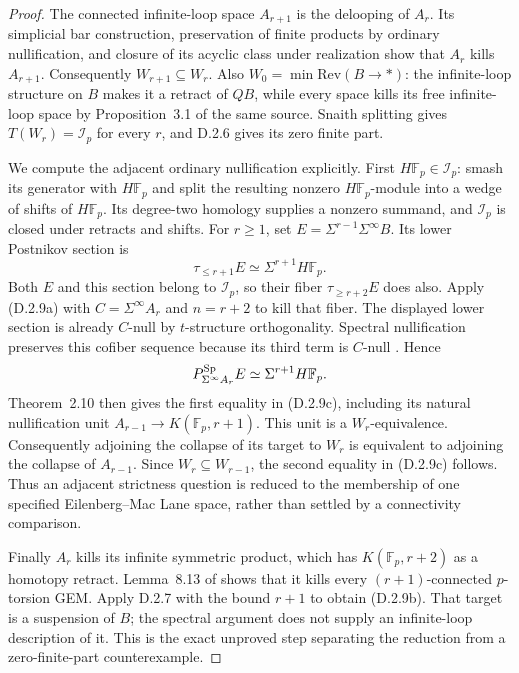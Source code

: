 \begin{proof}
The connected infinite-loop space $A_{r+1}$ is the delooping of
$A_r$. Its simplicial bar construction, preservation of finite
products by ordinary nullification, and closure of its acyclic
class under realization show that $A_r$ kills $A_{r+1}$.
Consequently $W_{r+1}\subseteq W_r$. Also
$W_0=\min\mathrm{Rev}(B\to *)$: the infinite-loop structure
on $B$ makes it a retract of $QB$, while every space kills its
free infinite-loop space by Proposition~3.1 of the same source.
Snaith splitting gives $T(W_r)=\mathcal I_p$ for every $r$,
and D.2.6 gives its zero finite part.

We compute the adjacent ordinary nullification explicitly. First
$H\mathbb F_p\in\mathcal I_p$: smash its generator with
$H\mathbb F_p$ and split the resulting nonzero
$H\mathbb F_p$-module into a wedge of shifts of
$H\mathbb F_p$. Its degree-two homology supplies a nonzero
summand, and $\mathcal I_p$ is closed under retracts and shifts.
For $r\geq1$, set $E=\Sigma^{r-1}\Sigma^\infty B$. Its lower
Postnikov section is
\[
 \tau_{\leq r+1}E\simeq\Sigma^{r+1}H\mathbb F_p.
\]
Both $E$ and this section belong to $\mathcal I_p$, so their
fiber $\tau_{\geq r+2}E$ does also. Apply
\textup{(D.2.9a)} with $C=\Sigma^\infty A_r$ and $n=r+2$ to
kill that fiber. The displayed lower section is already
$C$-null by $t$-structure orthogonality. Spectral nullification
preserves this cofiber sequence because its third term is
$C$-null \citep[Corollary~2.3]{Bousfield1996ULP}. Hence
\[
 P_{\Sigma^\infty A_r}^{\mathrm{Sp}}E
   \simeq\Sigma^{r+1}H\mathbb F_p.
\]
Theorem~2.10 then gives the first equality in
\textup{(D.2.9c)}, including its natural nullification unit
$A_{r-1}\to K(\mathbb F_p,r+1)$. This unit is a
$W_r$-equivalence. Consequently adjoining the collapse of its
target to $W_r$ is equivalent to adjoining the collapse of
$A_{r-1}$. Since $W_r\subseteq W_{r-1}$, the second equality
in \textup{(D.2.9c)} follows. Thus an adjacent strictness question
is reduced to the membership of one specified
Eilenberg--Mac Lane space, rather than settled by a connectivity
comparison.

Finally $A_r$ kills its infinite symmetric product, which has
$K(\mathbb F_p,r+2)$ as a homotopy retract. Lemma~8.13 of
\citet{EH5Bousfield1997} shows that it kills every
$(r+1)$-connected $p$-torsion GEM. Apply D.2.7 with the bound
$r+1$ to obtain \textup{(D.2.9b)}. That target is a suspension
of $B$; the spectral argument does not supply an infinite-loop
description of it. This is the exact unproved step separating
the reduction from a zero-finite-part counterexample.
\end{proof}
